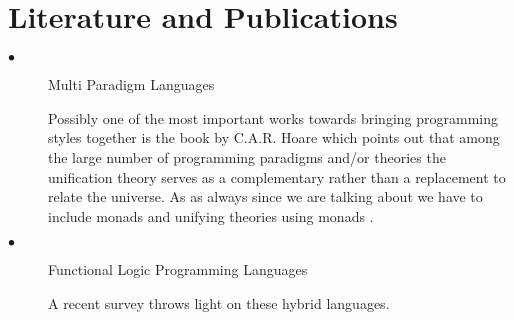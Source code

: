 \documentclass[proposal.tex]{subfiles}
\begin{document}
\section{Literature and Publications}
\begin{description}
\item[$\bullet$] Multi Paradigm Languages
\par Possibly one of the most important works towards bringing programming styles together is the book by C.A.R. Hoare \cite{hoare1998unifying} which points out that among the large number of programming paradigms and/or theories the unification theory serves as a complementary rather than a replacement to relate the universe. As as always since we are talking about  we have to include monads and unifying theories using monads \cite{gibbons2013unifying}.
 

\item[$\bullet$] Functional Logic Programming Languages

\par A recent survey \cite{hanus2007multi} throws light on these hybrid languages. 


\end{description}
\end{document}
